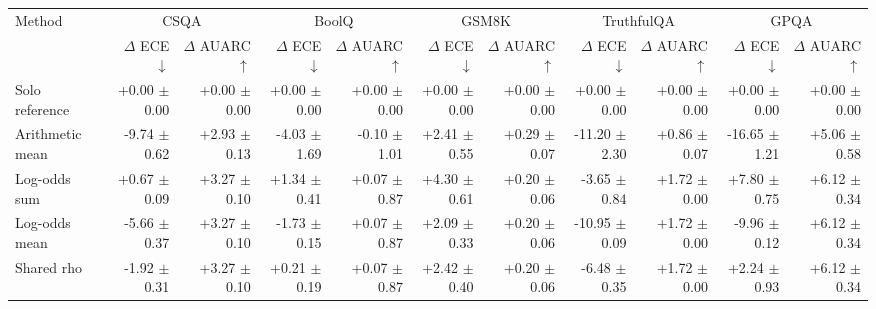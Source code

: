 \begin{tabular}{lrrrrrrrrrr}
\toprule
Method & \multicolumn{2}{c}{CSQA} & \multicolumn{2}{c}{BoolQ} & \multicolumn{2}{c}{GSM8K} & \multicolumn{2}{c}{TruthfulQA} & \multicolumn{2}{c}{GPQA} \\
 & $\Delta$ ECE $\downarrow$ & $\Delta$ AUARC $\uparrow$ & $\Delta$ ECE $\downarrow$ & $\Delta$ AUARC $\uparrow$ & $\Delta$ ECE $\downarrow$ & $\Delta$ AUARC $\uparrow$ & $\Delta$ ECE $\downarrow$ & $\Delta$ AUARC $\uparrow$ & $\Delta$ ECE $\downarrow$ & $\Delta$ AUARC $\uparrow$ \\
\midrule
Solo reference & +0.00 {\scriptsize $\pm$ 0.00} & +0.00 {\scriptsize $\pm$ 0.00} & +0.00 {\scriptsize $\pm$ 0.00} & +0.00 {\scriptsize $\pm$ 0.00} & +0.00 {\scriptsize $\pm$ 0.00} & +0.00 {\scriptsize $\pm$ 0.00} & +0.00 {\scriptsize $\pm$ 0.00} & +0.00 {\scriptsize $\pm$ 0.00} & +0.00 {\scriptsize $\pm$ 0.00} & +0.00 {\scriptsize $\pm$ 0.00} \\
Arithmetic mean & -9.74 {\scriptsize $\pm$ 0.62} & +2.93 {\scriptsize $\pm$ 0.13} & -4.03 {\scriptsize $\pm$ 1.69} & -0.10 {\scriptsize $\pm$ 1.01} & +2.41 {\scriptsize $\pm$ 0.55} & +0.29 {\scriptsize $\pm$ 0.07} & -11.20 {\scriptsize $\pm$ 2.30} & +0.86 {\scriptsize $\pm$ 0.07} & -16.65 {\scriptsize $\pm$ 1.21} & +5.06 {\scriptsize $\pm$ 0.58} \\
Log-odds sum & +0.67 {\scriptsize $\pm$ 0.09} & +3.27 {\scriptsize $\pm$ 0.10} & +1.34 {\scriptsize $\pm$ 0.41} & +0.07 {\scriptsize $\pm$ 0.87} & +4.30 {\scriptsize $\pm$ 0.61} & +0.20 {\scriptsize $\pm$ 0.06} & -3.65 {\scriptsize $\pm$ 0.84} & +1.72 {\scriptsize $\pm$ 0.00} & +7.80 {\scriptsize $\pm$ 0.75} & +6.12 {\scriptsize $\pm$ 0.34} \\
Log-odds mean & -5.66 {\scriptsize $\pm$ 0.37} & +3.27 {\scriptsize $\pm$ 0.10} & -1.73 {\scriptsize $\pm$ 0.15} & +0.07 {\scriptsize $\pm$ 0.87} & +2.09 {\scriptsize $\pm$ 0.33} & +0.20 {\scriptsize $\pm$ 0.06} & -10.95 {\scriptsize $\pm$ 0.09} & +1.72 {\scriptsize $\pm$ 0.00} & -9.96 {\scriptsize $\pm$ 0.12} & +6.12 {\scriptsize $\pm$ 0.34} \\
Shared rho & -1.92 {\scriptsize $\pm$ 0.31} & +3.27 {\scriptsize $\pm$ 0.10} & +0.21 {\scriptsize $\pm$ 0.19} & +0.07 {\scriptsize $\pm$ 0.87} & +2.42 {\scriptsize $\pm$ 0.40} & +0.20 {\scriptsize $\pm$ 0.06} & -6.48 {\scriptsize $\pm$ 0.35} & +1.72 {\scriptsize $\pm$ 0.00} & +2.24 {\scriptsize $\pm$ 0.93} & +6.12 {\scriptsize $\pm$ 0.34} \\

\end{tabular}
